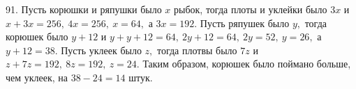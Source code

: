 91. Пусть корюшки и ряпушки было $x$ рыбок, тогда плоты и уклейки было $3x$ и $x+3x=256,\ 4x=256,\ x=64,$ а $3x=192.$ Пусть ряпушек было $y,$ тогда корюшек было $y+12$ и $y+y+12=64,\ 2y+12=64,\ 2y=52,\ y=26,$ а $y+12=38.$ Пусть уклеек было $z,$ тогда плотвы было $7z$ и $z+7z=192,\ 8z=192,\ z=24.$ Таким образом, корюшек было поймано больше, чем уклеек, на $38-24=14$ штук.\\
